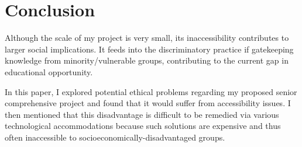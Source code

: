 \documentclass[10pt,twocolumn]{article}
\begin{document}
\section{Conclusion}
    Although the scale of my project is very small, its inaccessibility contributes to larger social implications. It feeds into the discriminatory practice if gatekeeping knowledge from minority/vulnerable groups, contributing to the current gap in educational opportunity.

    In this paper, I explored potential ethical problems regarding my proposed senior comprehensive project and found that it would suffer from accessibility issues. I then mentioned that this disadvantage is difficult to be remedied via various technological accommodations because such solutions are expensive and thus often inaccessible to socioeconomically-disadvantaged groups.

\printbibliography 
\end{document}
